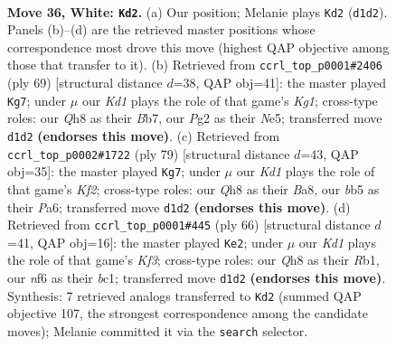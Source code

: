 \documentclass[11pt]{article}
\begin{document}
\clearpage

\begin{figure}[p]\centering
\begin{subfigure}{0.46\textwidth}\centering
\resizebox{\linewidth}{!}{%
\newchessgame
\chessboard[
  setfen={7Q/5k2/r4n2/pb1P4/4p3/6p1/PPP3P1/2RK4 w - - 0 36},
  showmover=false,
  pgfstyle=straightmove, color=movearrow, markmove={d1-d2}
]}
\caption{}
\end{subfigure}\hfill
\begin{subfigure}{0.46\textwidth}\centering
\resizebox{\linewidth}{!}{%
\newchessgame
\chessboard[
  setfen={5rk1/pb3p2/8/3NnP2/1p5P/8/P1P1B3/2KR4 b - - 2 35},
  showmover=false,
  pgfstyle=straightmove, color=movearrow, markmove={g8-g7}
]}
\caption{}
\end{subfigure}
\\[4pt]
\begin{subfigure}{0.46\textwidth}\centering
\resizebox{\linewidth}{!}{%
\newchessgame
\chessboard[
  setfen={b3r3/p4k1p/p1N3p1/8/3p4/1P1K4/P1R3PP/8 b - - 1 40},
  showmover=false,
  pgfstyle=straightmove, color=movearrow, markmove={f7-g7}
]}
\caption{}
\end{subfigure}\hfill
\begin{subfigure}{0.46\textwidth}\centering
\resizebox{\linewidth}{!}{%
\newchessgame
\chessboard[
  setfen={8/2r2p2/1p5p/4k3/1p5P/3B1K2/PP3P2/1Rb5 w - - 1 34},
  showmover=false,
  pgfstyle=straightmove, color=movearrow, markmove={f3-e2}
]}
\caption{}
\end{subfigure}
\caption{\textbf{Move 36, White: \texttt{Kd2}.} (a) Our position; Melanie plays \texttt{Kd2} (\texttt{d1d2}). Panels (b)--(d) are the retrieved master positions whose correspondence most drove this move (highest QAP objective among those that transfer to it). (b) Retrieved from \texttt{ccrl\_top\_p0001\#2406} (ply 69) [structural distance $d$=38, QAP obj=41]: the master played \texttt{Kg7}; under $\mu$ our \emph{Kd1} plays the role of that game's \emph{Kg1}; cross-type roles: our \emph{Q}h8 as their \emph{B}b7, our \emph{P}g2 as their \emph{N}e5; transferred move \texttt{d1d2} \textbf{(endorses this move)}. (c) Retrieved from \texttt{ccrl\_top\_p0002\#1722} (ply 79) [structural distance $d$=43, QAP obj=35]: the master played \texttt{Kg7}; under $\mu$ our \emph{Kd1} plays the role of that game's \emph{Kf2}; cross-type roles: our \emph{Q}h8 as their \emph{B}a8, our \emph{b}b5 as their \emph{P}a6; transferred move \texttt{d1d2} \textbf{(endorses this move)}. (d) Retrieved from \texttt{ccrl\_top\_p0001\#445} (ply 66) [structural distance $d$=41, QAP obj=16]: the master played \texttt{Ke2}; under $\mu$ our \emph{Kd1} plays the role of that game's \emph{Kf3}; cross-type roles: our \emph{Q}h8 as their \emph{R}b1, our \emph{n}f6 as their \emph{b}c1; transferred move \texttt{d1d2} \textbf{(endorses this move)}. Synthesis: 7 retrieved analogs transferred to \texttt{Kd2} (summed QAP objective 107, the strongest correspondence among the candidate moves); Melanie committed it via the \texttt{search} selector.}
\label{fig:thought-m70}
\end{figure}
\end{document}
